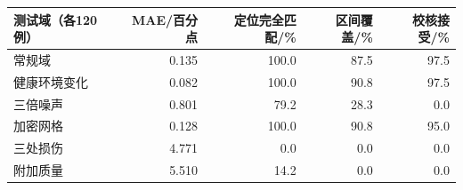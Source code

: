 \begin{tabular}{lrrrr}\toprule
测试域（各120例） & MAE/百分点 & 定位完全匹配/\% & 区间覆盖/\% & 校核接受/\%\\\midrule
常规域 & 0.135 & 100.0 & 87.5 & 97.5 \\
健康环境变化 & 0.082 & 100.0 & 90.8 & 97.5 \\
三倍噪声 & 0.801 & 79.2 & 28.3 & 0.0 \\
加密网格 & 0.128 & 100.0 & 90.8 & 95.0 \\
三处损伤 & 4.771 & 0.0 & 0.0 & 0.0 \\
附加质量 & 5.510 & 14.2 & 0.0 & 0.0 \\
\bottomrule\end{tabular}
